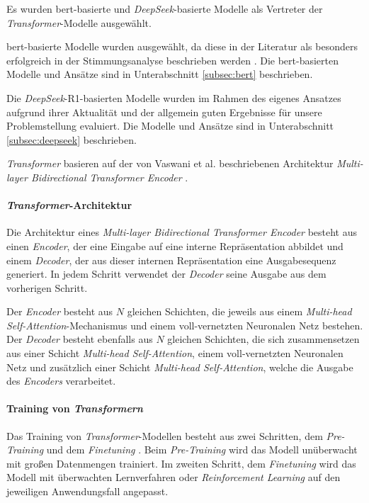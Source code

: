 Es wurden \gls{bert}-basierte und \textit{DeepSeek}-basierte Modelle als Vertreter der \textit{Transformer}-Modelle ausgewählt.

\gls{bert}-basierte Modelle wurden ausgewählt, da diese in der Literatur als besonders erfolgreich in der Stimmungsanalyse beschrieben werden \cite{devlin2018bert}.
Die \gls{bert}-basierten Modelle und Ansätze sind in Unterabschnitt \ref{subsec:bert} beschrieben.

Die \textit{DeepSeek}-R1-basierten Modelle wurden im Rahmen des eigenes Ansatzes aufgrund ihrer Aktualität und der allgemein guten Ergebnisse für unsere Problemstellung evaluiert.
Die Modelle und Ansätze sind in Unterabschnitt \ref{subsec:deepseek} beschrieben.

\textit{Transformer} basieren auf der von Vaswani et al. beschriebenen Architektur \textit{Multi-layer Bidirectional Transformer Encoder} \cite{vaswani2017attention}.

\paragraph{\textit{Transformer}-Architektur}
Die Architektur eines \textit{Multi-layer Bidirectional Transformer Encoder} besteht aus einen \textit{Encoder}, der eine Eingabe auf eine interne Repräsentation abbildet und einem \textit{Decoder}, der aus dieser internen Repräsentation eine Ausgabesequenz generiert.
In jedem Schritt verwendet der \textit{Decoder} seine Ausgabe aus dem vorherigen Schritt.

Der \textit{Encoder} besteht aus $N$ gleichen Schichten, die jeweils aus einem \textit{Multi-head Self-Attention}-Mechanismus und einem voll-vernetzten Neuronalen Netz bestehen.
Der \textit{Decoder} besteht ebenfalls aus $N$ gleichen Schichten, die sich zusammensetzen aus einer Schicht \textit{Multi-head Self-Attention}, einem voll-vernetzten Neuronalen Netz und zusätzlich einer Schicht \textit{Multi-head Self-Attention}, welche die Ausgabe des \textit{Encoders} verarbeitet.

\paragraph{Training von \textit{Transformern}}

Das Training von \textit{Transformer}-Modellen besteht aus zwei Schritten, dem \textit{Pre-Training} und dem \textit{Finetuning} \cite{Radford2018ImprovingLU}.
Beim \textit{Pre-Training} wird das Modell unüberwacht mit großen Datenmengen trainiert.
Im zweiten Schritt, dem \textit{Finetuning} wird das Modell mit überwachten Lernverfahren oder \textit{Reinforcement Learning} \cite{deepseekai2025deepseekr1incentivizingreasoningcapability, devlin2018bert} auf den jeweiligen Anwendungsfall angepasst.


